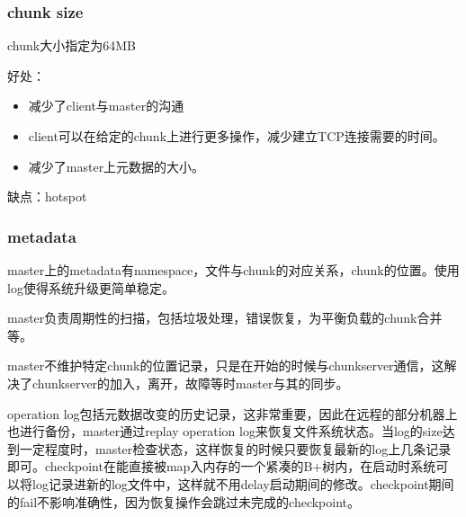 \documentclass{ctexart}
\begin{document}
\subsubsection{chunk size}
chunk大小指定为64MB

好处：
\begin{itemize}
	\item 减少了client与master的沟通
	\item client可以在给定的chunk上进行更多操作，减少建立TCP连接需要的时间。
	\item 减少了master上元数据的大小。
\end{itemize}

缺点：hotspot
\subsubsection{metadata}
master上的metadata有namespace，文件与chunk的对应关系，chunk的位置。使用log使得系统升级更简单稳定。

master负责周期性的扫描，包括垃圾处理，错误恢复，为平衡负载的chunk合并等。

master不维护特定chunk的位置记录，只是在开始的时候与chunkserver通信，这解决了chunkserver的加入，离开，故障等时master与其的同步。

operation log包括元数据改变的历史记录，这非常重要，因此在远程的部分机器上也进行备份，master通过replay operation log来恢复文件系统状态。当log的size达到一定程度时，master检查状态，这样恢复的时候只要恢复最新的log上几条记录即可。checkpoint在能直接被map入内存的一个紧凑的B+树内，在启动时系统可以将log记录进新的log文件中，这样就不用delay启动期间的修改。checkpoint期间的fail不影响准确性，因为恢复操作会跳过未完成的checkpoint。
\end{document}
